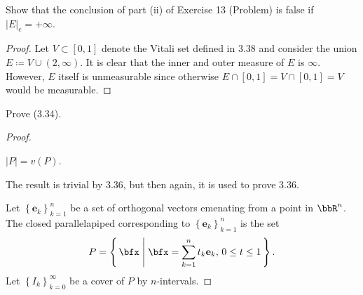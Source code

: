 \begin{problem}
Show that the conclusion of part  (ii) of Exercise 13 (Problem) is false if
$\left|E\right|_e=+\infty$.
\end{problem}
\begin{proof}
Let $V\subset[0,1]$ denote the Vitali set defined in 3.38 and consider the
union $E\coloneqq V\cup(2,\infty)$. It is clear that the inner and outer
measure of $E$ is $\infty$. However, $E$ itself is unmeasurable since
otherwise $E\cap[0,1]=V\cap[0,1]=V$ would be measurable.
\end{proof}
\newpage

\begin{problem}
Prove (3.34).
\end{problem}
\begin{proof}
\begin{lemma*}
$\left|P\right|=v(P)$.
\end{lemma*}
The result is trivial by 3.36, but then again, it is used to prove 3.36.

Let $\left\{\mathbf{e}_k\right\}_{k=1}^n$ be a set of orthogonal vectors
emenating from a point in $\bbR^n$. The closed parallelapiped corresponding
to $\left\{\mathbf{e}_k\right\}_{k=1}^n$ is the set
\begin{equation}
\label{eq:closed-parallelapiped}
P=
\left\{\,\bfx\;\middle|\;
\text{$\bfx=\sum_{k=1}^nt_k\mathbf{e}_k$, $0\leq t\leq 1$}\,\right\}.
\end{equation}
Let $\left\{I_k\right\}_{k=0}^\infty$ be a cover of $P$ by $n$-intervals.
\end{proof}
\newpage

